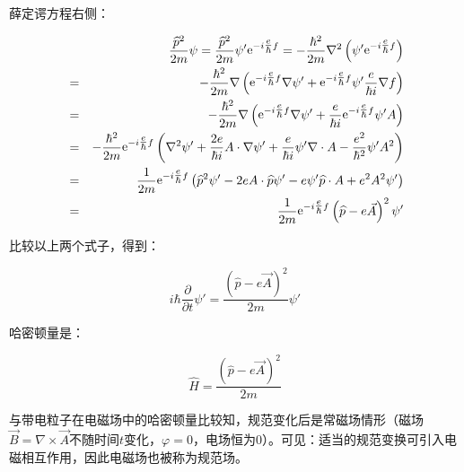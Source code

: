 薛定谔方程右侧：

\begin{eqnarray*}
{} &{}&\frac{{\widehat p^2 }}{{2m}}\psi  =  \frac{{\widehat p^2 }}{{2m}}\psi '{\mathop{\rm e}\nolimits} ^{ - i{\textstyle{e \over \hbar }}f } =  - \frac{{\hbar ^2 }}{{2m}}\nabla ^2 \left( {\psi '{\mathop{\rm e}\nolimits} ^{ - i{\textstyle{e \over \hbar }}f  } } \right) \\
{} &=&  - \frac{{\hbar ^2 }}{{2m}}\nabla \left( {{\mathop{\rm e}\nolimits} ^{ - i{\textstyle{e \over \hbar }}f } \nabla \psi ' + {\mathop{\rm e}\nolimits} ^{ - i{\textstyle{e \over \hbar }}f } \psi '\frac{e}{{\hbar i}}\nabla f} \right) \\
{} & = &  - \frac{{\hbar ^2 }}{{2m}}\nabla \left( {{\mathop{\rm e}\nolimits} ^{ - i{\textstyle{e \over \hbar }}f } \nabla \psi ' + \frac{e}{{\hbar i}}{\mathop{\rm e}\nolimits} ^{ - i{\textstyle{e \over \hbar }}f } \psi 'A} \right) \\
{} & = &  - \frac{{\hbar ^2 }}{{2m}}{\mathop{\rm e}\nolimits} ^{ - i{\textstyle{e \over \hbar }}f } \left( {\nabla ^2 \psi ' + \frac{{2e}}{{\hbar i}}A \cdot \nabla \psi ' + \frac{e}{{\hbar i}}\psi '\nabla  \cdot A - \frac{{e^2 }}{{\hbar ^2 }} \psi 'A^2 } \right) \\
{} & = & \frac{1}{{2m}}{\mathop{\rm e}\nolimits} ^{ - i{\textstyle{e \over \hbar }}f } \left( {\widehat p^2 \psi ' - 2eA \cdot \widehat p\psi ' - e\psi '\widehat p \cdot A + e^2 A^2 \psi '} \right) \\
{} & = & \frac{1}{{2m}}{\mathop{\rm e}\nolimits} ^{ - i{\textstyle{e \over \hbar }}f } \left( {\widehat p - e\vec A} \right)^2 \psi ' 
\end{eqnarray*}

比较以上两个式子，得到：

\begin{equation}
i\hbar \frac{\partial }{{\partial t}}\psi ' = \frac{{\left( {\widehat p - e\vec A} \right)^2 }}{{2m}}\psi '
\end{equation}

哈密顿量是：

\begin{equation}
\widehat H = \frac{{\left( {\widehat p - e\vec A} \right)^2 }}{{2m}}
\end{equation}

与带电粒子在电磁场中的哈密顿量比较知，规范变化后是常磁场情形（磁场$\vec B = \nabla  \times \vec A$不随时间$t$变化，$\varphi  = 0$，电场恒为0）。可见：适当的规范变换可引入电磁相互作用，因此电磁场也被称为规范场。


